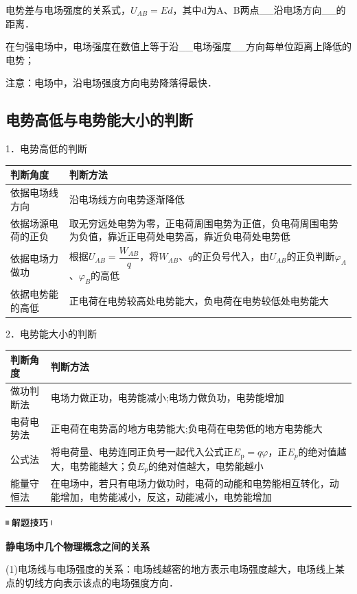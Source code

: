 电势差与电场强度的关系式，$U_{A B}=E d$，其中d为A、B两点\_\_沿电场方向\_\_的距离．

在匀强电场中，电场强度在数值上等于沿\_\_电场强度\_\_方向每单位距离上降低的电势；

注意：电场中，沿电场强度方向电势降落得最快．


\newpage


\subsection{电势高低与电势能大小的判断}

1．电势高低的判断

\begin{longtable}[]{@{}m{3.5cm}m{11cm}@{}}
\toprule
判断角度 & 判断方法\tabularnewline
\midrule
\endhead
依据电场线方向 & 沿电场线方向电势逐渐降低\tabularnewline
依据场源电荷的正负 &
取无穷远处电势为零，正电荷周围电势为正值，负电荷周围电势为负值，靠近正电荷处电势高，靠近负电荷处电势低\tabularnewline
依据电场力做功 &
根据$U_{A B}=\dfrac{W_{A B}}{q}$，将$W_{A B}$、$q$的正负号代入，由$U_{A B}$的正负判断$\varphi _A$、$\varphi_B$的高低\tabularnewline
依据电势能的高低 &
正电荷在电势较高处电势能大，负电荷在电势较低处电势能大\tabularnewline
\bottomrule
\end{longtable}

2．电势能大小的判断

\begin{longtable}[]{@{}m{2cm}m{13cm}@{}}
\toprule
判断角度 & 判断方法\tabularnewline
\midrule
\endhead
做功判断法&电场力做正功，电势能减小;电场力做负功，电势能增加\tabularnewline
电荷电势法&正电荷在电势高的地方电势能大;负电荷在电势低的地方电势能大\tabularnewline
公式法 &
将电荷量、电势连同正负号一起代入公式正$E_{\mathrm{p}}=q \varphi$，正$E_p$的绝对值越大，电势能越大；负$E_p$的绝对值越大，电势能越小\tabularnewline
能量守恒法 &
在电场中，若只有电场力做功时，电荷的动能和电势能相互转化，动能增加，电势能减小，反这，动能减小，电势能增加\tabularnewline
\bottomrule
\end{longtable}

\begin{center}\includegraphics[width=0.70833in,height=0.125in]{media/image37.png}

\textbf{静电场中几个物理概念之间的关系}
\end{center}


(1)电场线与电场强度的关系：电场线越密的地方表示电场强度越大，电场线上某点的切线方向表示该点的电场强度方向．

